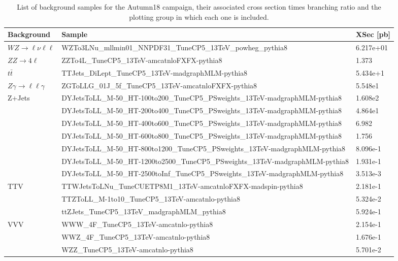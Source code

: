 \begin{sidewaystable}[htb]
\begin{center}
  \caption{List of background samples for the Autumn18 campaign, their
    associated cross section times branching ratio and the plotting group
    in which each one is included.}
\footnotesize
\begin{tabular}{|l|l|l|}
\hline
Background  & Sample & XSec [pb] \\ \hline
\hline $WZ\rightarrow\ell\nu\ell\ell$
&WZTo3LNu\_mllmin01\_NNPDF31\_TuneCP5\_13TeV\_powheg\_pythia8  & 6.217e+01 \\
\hline $ZZ\rightarrow4\ell$
&ZZTo4L\_TuneCP5\_13TeV-amcatnloFXFX-pythia8 & 1.373\\
\hline $t\bar{t}$
&TTJets\_DiLept\_TuneCP5\_13TeV-madgraphMLM-pythia8 & 5.434e+1 \\
\hline $Z\gamma\rightarrow\ell\ell\gamma$
&ZGToLLG\_01J\_5f\_TuneCP5\_13TeV-amcatnloFXFX-pythia8 & 5.548e1 \\
\hline Z+Jets
& DYJetsToLL\_M-50\_HT-100to200\_TuneCP5\_PSweights\_13TeV-madgraphMLM-pythia8   & 1.608e2 \\
& DYJetsToLL\_M-50\_HT-200to400\_TuneCP5\_PSweights\_13TeV-madgraphMLM-pythia8   & 4.864e1 \\
& DYJetsToLL\_M-50\_HT-400to600\_TuneCP5\_PSweights\_13TeV-madgraphMLM-pythia8   & 6.982 \\
& DYJetsToLL\_M-50\_HT-600to800\_TuneCP5\_PSweights\_13TeV-madgraphMLM-pythia8   & 1.756 \\
& DYJetsToLL\_M-50\_HT-800to1200\_TuneCP5\_PSweights\_13TeV-madgraphMLM-pythia8  & 8.096e-1\\
& DYJetsToLL\_M-50\_HT-1200to2500\_TuneCP5\_PSweights\_13TeV-madgraphMLM-pythia8 & 1.931e-1\\
& DYJetsToLL\_M-50\_HT-2500toInf\_TuneCP5\_PSweights\_13TeV-madgraphMLM-pythia8  & 3.513e-3\\
\hline TTV
&TTWJetsToLNu\_TuneCUETP8M1\_13TeV-amcatnloFXFX-madspin-pythia8 & 2.181e-1 \\
&TTZToLL\_M-1to10\_TuneCP5\_13TeV-amcatnlo-pythia8      & 5.324e-2 \\
&ttZJets\_TuneCP5\_13TeV\_madgraphMLM\_pythia8          & 5.924e-1 \\
\hline VVV
&WWW\_4F\_TuneCP5\_13TeV-amcatnlo-pythia8 & 2.154e-1 \\
&WWZ\_4F\_TuneCP5\_13TeV-amcatnlo-pythia8 & 1.676e-1 \\
&WZZ\_TuneCP5\_13TeV-amcatnlo-pythia8     & 5.701e-2 \\

\end{tabular}
\end{center}
\end{sidewaystable}

